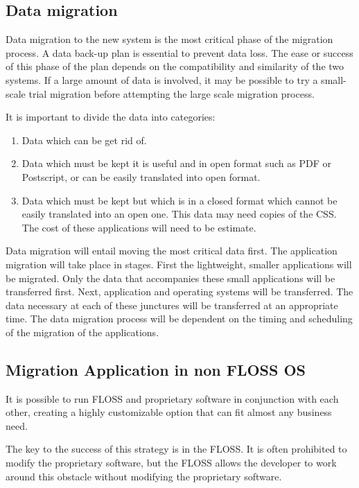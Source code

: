     \subsection{Data migration}
    
    Data migration to the new system is the most critical phase of the migration process. A data back-up plan is essential to prevent data loss. The ease or success of this phase of the plan depends on the compatibility and similarity of the two systems. If a large amount of data is involved, it may be possible to try a small-scale trial migration before attempting the large scale migration process. 
  
    It is important to divide the data into categories:
    \begin{enumerate}
    \item Data which can be get rid of.
     \item Data which must be kept it is useful and in open format such as PDF or Postscript, or can be easily translated into open format.
      \item  Data which must be kept but which is in a closed format which cannot be easily translated into an open one. This data may need copies of the CSS. The cost of these applications will need to be estimate.
    \end{enumerate}

    Data migration will entail moving the most critical data first. The application migration will take place in stages. First the lightweight, smaller applications will be migrated. Only the data that accompanies these small applications will be transferred first. Next, application and operating systems will be transferred. The data necessary at each of these junctures will be transferred at an appropriate time. The data migration process will be dependent on the timing and scheduling of the migration of the applications. 
    
    
    \subsection {Migration Application in non FLOSS OS}
    
    It is possible to run FLOSS and proprietary software in conjunction with each other, creating a highly customizable option that can fit almost any business need.
    
    The key to the success of this strategy is in the FLOSS. It is often prohibited to modify the proprietary software, but the FLOSS allows the developer to work around this obstacle without modifying the proprietary software. 
    
